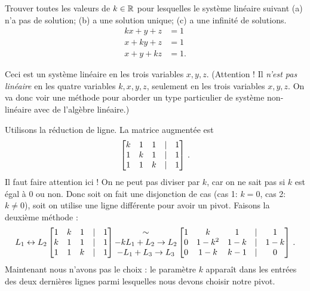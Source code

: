 \begin{myprob} Trouver toutes les valeurs de $k\in\mathbb{R}$ pour lesquelles le système linéaire suivant
(a) n'a  pas de solution; (b) a une solution unique;
(c) a une infinité de solutions.
\begin{align*}
kx + y + z &=1\\
x +ky + z &= 1\\
x+y+kz &= 1.
\end{align*}

\begin{mysol}  Ceci est un système linéaire en les trois variables $x,y,z$. (Attention ! Il 
{\it n'est pas lin\'eaire} en les quatre variables $k,x,y,z$, seulement en les trois variables $x,y,z$.  On va donc voir une méthode pour aborder un type particulier
de système non-linéaire avec de l'algèbre linéaire.)

Utilisons la réduction de ligne.  La matrice augmentée est
$$
\left[ \begin{matrix} k & 1 & 1 &|& 1\\
1&k&1&|&1\\
1&1&k&|&1 \end{matrix} \right]\,.
$$
Il faut faire attention ici !  On ne peut pas diviser par $k$, car on ne sait pas si $k$ est \'egal \`a $0$ ou non.  Donc soit on fait une disjonction de
cas (cas 1: $k=0$, cas 2:  $k\neq0$), soit on utilise une 
ligne différente pour avoir un pivot. Faisons la deuxième méthode :
$$
\begin{matrix} L_1 \leftrightarrow L_2 \end{matrix}
\left[ \begin{matrix} 1&k&1&|&1\\
k & 1 & 1 &|& 1\\
1&1&k&|&1 \end{matrix} \right]
\begin{matrix} \sim \\ -kL_1+L_2\to L_2 \\ -L_1+L_3 \to L_3 \end{matrix}
\left[ \begin{matrix} 
1&k&1&|&1\\
0 & 1-k^2 & 1-k &|& 1-k\\
0&1-k&k-1&|&0 \end{matrix} \right]\,.
$$
Maintenant nous n'avons pas le choix : le param\`etre $k$ apparaît dans les entrées des deux derni\`eres lignes parmi lesquelles nous devons choisir notre pivot.


\end{mysol}
\end{myprob}

